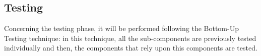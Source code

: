 \documentclass[DD.tex]{subfiles}
\begin{document}
\newpage

\subsection{Testing}
Concerning the testing phase, it will be performed following the Bottom-Up Testing technique: in this technique, all the sub-components are previously tested individually and then, the components that rely upon this components are tested. 

\newpage
\end{document}
